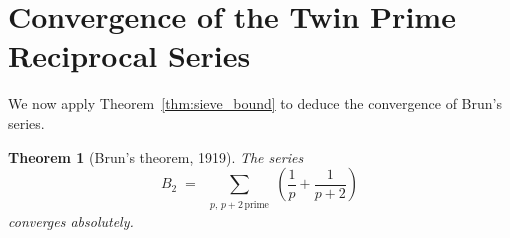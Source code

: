 \documentclass[12pt,a4paper]{amsart}
\newtheorem{theorem}{Theorem}[section]
\theoremstyle{definition}
\begin{document}
\section{Convergence of the Twin Prime Reciprocal Series}
\label{sec:convergence}

We now apply Theorem~\ref{thm:sieve_bound} to deduce the convergence of
Brun's series.

\begin{theorem}[Brun's theorem, 1919]\label{thm:brun_convergence}
  The series
  \[
    B_2 \;=\; \sum_{\substack{p,\,p+2\,\text{prime}}}
               \left(\frac{1}{p} + \frac{1}{p+2}\right)
  \]
  converges absolutely.
\end{theorem}
\end{document}
